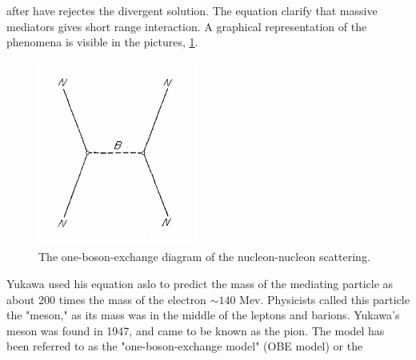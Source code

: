 \documentclass[12pt,a4paper]{book}
\begin{document}
	after have rejectes the divergent solution. The equation \cite{eq:klein-gordon-final-sol} clarify that massive mediators gives short range interaction. A graphical representation of the phenomena is visible in the pictures, \ref{fig:one_boson_exchange}.
	\begin{figure}[ht]
		\centering
		\includegraphics[width=0.7\linewidth]{pictures/one_boson_exchange.png}
		\caption{The one-boson-exchange diagram of the nucleon-nucleon scattering.}
		\label{fig:one_boson_exchange} 
	\end{figure}
	Yukawa used his equation aslo to predict the mass of the mediating particle as about 200 times the mass of the electron $\sim 140$ Mev. Physicists called this particle the "meson," as its mass was in the middle of the leptons and barions. Yukawa's meson was found in 1947, and came to be known as the pion.
	The model has been referred to as the "one-boson-exchange model" (OBE model) or the
\end{document}
